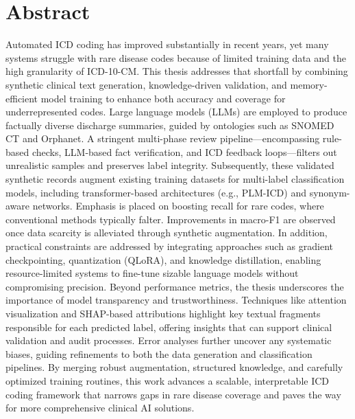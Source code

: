 \chapter*{Abstract}
\label{chap:abstract}

Automated ICD coding has improved substantially in recent years, yet many systems struggle with rare disease codes because of limited training data and the high granularity of ICD-10-CM. This thesis addresses that shortfall by combining synthetic clinical text generation, knowledge-driven validation, and memory-efficient model training to enhance both accuracy and coverage for underrepresented codes. Large language models (LLMs) are employed to produce factually diverse discharge summaries, guided by ontologies such as SNOMED CT and Orphanet. A stringent multi-phase review pipeline—encompassing rule-based checks, LLM-based fact verification, and ICD feedback loops—filters out unrealistic samples and preserves label integrity. Subsequently, these validated synthetic records augment existing training datasets for multi-label classification models, including transformer-based architectures (e.g., PLM-ICD) and synonym-aware networks. Emphasis is placed on boosting recall for rare codes, where conventional methods typically falter. Improvements in macro-F1 are observed once data scarcity is alleviated through synthetic augmentation. In addition, practical constraints are addressed by integrating approaches such as gradient checkpointing, quantization (QLoRA), and knowledge distillation, enabling resource-limited systems to fine-tune sizable language models without compromising precision. Beyond performance metrics, the thesis underscores the importance of model transparency and trustworthiness. Techniques like attention visualization and SHAP-based attributions highlight key textual fragments responsible for each predicted label, offering insights that can support clinical validation and audit processes. Error analyses further uncover any systematic biases, guiding refinements to both the data generation and classification pipelines. By merging robust augmentation, structured knowledge, and carefully optimized training routines, this work advances a scalable, interpretable ICD coding framework that narrows gaps in rare disease coverage and paves the way for more comprehensive clinical AI solutions.